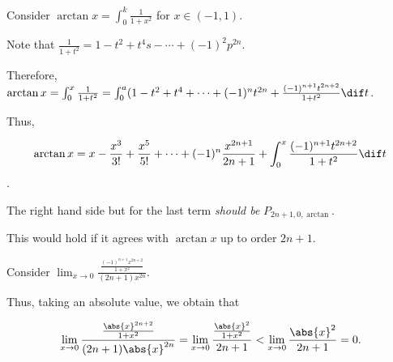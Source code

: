 \documentclass[11pt]{scrartcl}
\begin{document}
Consider $\arctan x = \int_0^{k} \frac{1}{1+x^{2}}$ for $x\in(-1, 1)$.

Note that $\frac{1}{1+t^2} = 1-t^2+t^4s-\cdots +(-1)^2p^{2n}$.

Therefore,
$\arctan x = \int_0^x
\frac{1}{1+t^2}=\int_0^a(1-t^2+t^4+\dots+(-1)^{n}t^{2n} +
\frac{(-1)^{n+1}t^{2n+2}}{1+t^{2}} \dif t$.

Thus,

\[\arctan x = x- \frac{x^3}{3!}+\frac{x^5}{5!} + \dots + (-1)^n \frac{x^{2n+1}}{2n+1} + \int_0^x \frac{(-1)^{n+1}t^{2n+2}}{1+t^2}\dif t\].

The right hand side but for the last term \textit{should be} $P_{2n+1, 0, \arctan}$.

This would hold if it agrees with $\arctan x$ up to order $2n+1$.

Consider $\lim_{x\to 0} \frac{\frac{(-1)^{n+1}x^{2n+2}}{1+x^2}}{(2n+1)x^{2n}}$.

Thus, taking an absolute value, we obtain that


\begin{equation*}
  \lim_{x\to 0} \frac{\frac{\abs{x}^{2n+2}}{1+x^2}}{(2n+1)\abs{x}^{2n}} = \lim_{x\to 0} \frac{\frac{\abs{x}^2}{1+x^2}}{2n+1} < \lim_{x\to 0} \frac{\abs{x}^2}{2n+1} = 0.
\end{equation*}
\end{document}
